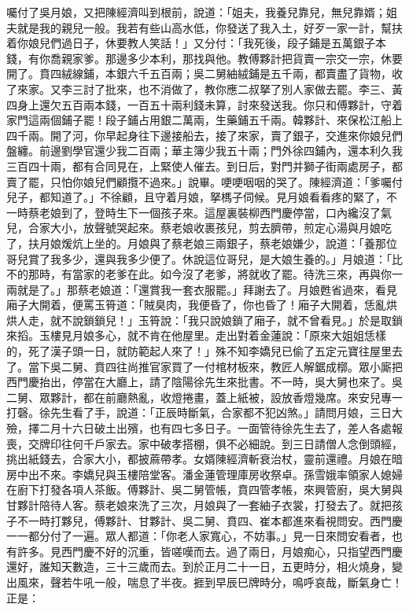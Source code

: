 \begin{showcontents}{}
囑付了吳月娘，又把陳經濟叫到根前，說道：「姐夫，我養兒靠兒，無兒靠婿；姐夫就是我的親兒一般。我若有些山高水低，你發送了我入土，好歹一家一計，幫扶着你娘兒們過日子，休要教人笑話！」又分付：「我死後，段子鋪是五萬銀子本錢，有你喬親家爹。那邊多少本利，那找與他。教傅夥計把貨賣一宗交一宗，休要開了。賁四絨線鋪，本銀六千五百兩；吳二舅紬絨鋪是五千兩，都賣盡了貨物，收了來家。又李三討了批來，也不消做了，教你應二叔拏了別人家做去罷。李三、黃四身上還欠五百兩本錢，一百五十兩利錢未算，討來發送我。你只和傅夥計，守着家門這兩個鋪子罷！段子鋪占用銀二萬兩，生藥鋪五千兩。韓夥計、來保松江船上四千兩。開了河，你早起身往下邊接船去，接了來家，賣了銀子，交進來你娘兒們盤纏。前邊劉學官還少我二百兩；華主簿少我五十兩；門外徐四鋪內，還本利久我三百四十兩，都有合同見在，上緊使人催去。到日后，對門并獅子街兩處房子，都賣了罷，只怕你娘兒們顧攬不過來。」說畢。哽哽咽咽的哭了。陳經濟道：「爹囑付兒子，都知道了。」不徐顧，且守着月娘，拏榪子伺候。見月娘看看疼的緊了，不一時蔡老娘到了，登時生下一個孩子來。這屋裏裝柳西門慶停當，口內纔沒了氣兒，合家大小，放聲號哭起來。蔡老娘收裹孩兒，剪去臍帶，煎定心湯與月娘吃了，扶月娘煖炕上坐的。月娘與了蔡老娘三兩銀子，蔡老娘嫌少，說道：「養那位哥兒賞了我多少，還與我多少便了。休說這位哥兒，是大娘生養的。」月娘道：「比不的那時，有當家的老爹在此。如今沒了老爹，將就收了罷。待洗三來，再與你一兩就是了。」那蔡老娘道：「還賞我一套衣服罷。」拜謝去了。月娘甦省過來，看見廂子大開着，便罵玉筲道：「賊臭肉，我便昏了，你也昏了！廂子大開着，恁亂烘烘人走，就不說鎖鎖兒！」玉筲說：「我只說娘鎖了廂子，就不曾看見。」於是取鎖來搯。玉樓見月娘多心，就不肯在他屋里。走出對着金蓮說：「原來大姐姐恁樣的，死了漢子頭一日，就防範起人來了！」殊不知李嬌兒已偷了五定元寶往屋里去了。當下吳二舅、賁四往尚推官家買了一付棺材板來，教匠人解鋸成槨。眾小廝把西門慶抬出，停當在大廳上，請了陰陽徐先生來批書。不一時，吳大舅也來了。吳二舅、眾夥計，都在前廳熱亂，收燈捲畫，蓋上紙被，設放香燈幾席。來安兒專一打磬。徐先生看了手，說道：「正辰時斷氣，合家都不犯凶煞。」請問月娘，三日大殮，擇二月十六日破土出殯，也有四七多日子。一面管待徐先生去了，差人各處報喪，交牌印往何千戶家去。家中破孝搭棚，俱不必細說。到三日請僧人念倒頭經，挑出紙錢去，合家大小，都披蔴帶孝。女婿陳經濟斬衰治杖，靈前還禮。月娘在暗房中出不來。李嬌兒與玉樓陪堂客。潘金蓮管理庫房收祭卓。孫雪娥率領家人媳婦在廚下打發各項人茶飯。傅夥計、吳二舅管帳，賁四管孝帳，來興管廚，吳大舅與甘夥計陪待人客。蔡老娘來洗了三次，月娘與了一套紬子衣裳，打發去了。就把孩子不一時打夥兒，傅夥計、甘夥計、吳二舅、賁四、崔本都進來看視問安。西門慶一一都分付了一遍。眾人都道：「你老人家寬心，不妨事。」見一日來問安看者，也有許多。見西門慶不好的沉重，皆嗟嘆而去。過了兩日，月娘痴心，只指望西門慶還好，誰知天數造，三十三歲而去。到於正月二十一日，五更時分，相火燒身，變出風來，聲若牛吼一般，喘息了半夜。捱到早辰巳牌時分，鳴呼哀哉，斷氣身亡！正是：


\end{showcontents}
